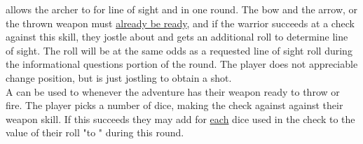 \begin{multicols*}{2}
{ allows the archer to  for line of sight and  in one round. The bow and the arrow, or the thrown weapon must \ul{already be ready}, and if the warrior succeeds at a  check against this skill, they jostle about and gets an additional roll to determine line of sight. The roll will be at the same odds as a requested line of sight roll during the informational questions portion of the round. The player does not appreciable change position, but is just jostling to obtain a shot.\\

A  can be used to  whenever the adventure has their weapon ready to throw or fire. The player picks a number of dice, making the check against against their weapon skill. If this succeeds they may add  for \ul{each} dice used in the check to the value of their roll "to " during this round.\\

}
\end{multicols*}

